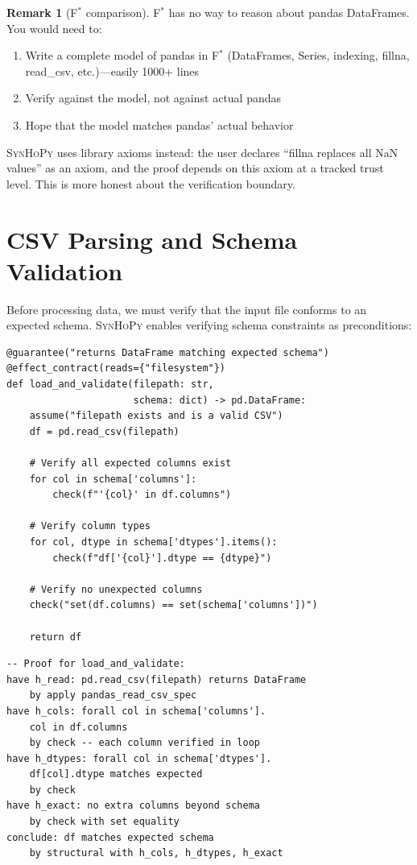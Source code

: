 \documentclass[11pt,a4paper]{report}
\theoremstyle{definition}
\newtheorem{remark}[definition]{Remark}
\theoremstyle{plain}
\newcommand{\fstar}{F$^{*}$}
\newcommand{\synhopy}{\textsc{SynHoPy}}
\begin{document}
\begin{remark}[\fstar{} comparison]
\fstar{} has no way to reason about pandas DataFrames. You would need to:
\begin{enumerate}
  \item Write a complete model of pandas in \fstar{} (DataFrames, Series, indexing,
    fillna, read\_csv, etc.)---easily 1000+ lines
  \item Verify against the model, not against actual pandas
  \item Hope that the model matches pandas' actual behavior
\end{enumerate}
\synhopy{} uses library axioms instead: the user declares ``fillna replaces all
NaN values'' as an axiom, and the proof depends on this axiom at a tracked trust
level. This is more honest about the verification boundary.
\end{remark}

\section{CSV Parsing and Schema Validation}

Before processing data, we must verify that the input file conforms to an
expected schema.  \synhopy{} enables verifying schema constraints as
preconditions:

\begin{lstlisting}[style=synhopy]
@guarantee("returns DataFrame matching expected schema")
@effect_contract(reads={"filesystem"})
def load_and_validate(filepath: str,
                      schema: dict) -> pd.DataFrame:
    assume("filepath exists and is a valid CSV")
    df = pd.read_csv(filepath)

    # Verify all expected columns exist
    for col in schema['columns']:
        check(f"'{col}' in df.columns")

    # Verify column types
    for col, dtype in schema['dtypes'].items():
        check(f"df['{col}'].dtype == {dtype}")

    # Verify no unexpected columns
    check("set(df.columns) == set(schema['columns'])")

    return df
\end{lstlisting}

\begin{lstlisting}[style=proof]
-- Proof for load_and_validate:
have h_read: pd.read_csv(filepath) returns DataFrame
    by apply pandas_read_csv_spec
have h_cols: forall col in schema['columns'].
    col in df.columns
    by check -- each column verified in loop
have h_dtypes: forall col in schema['dtypes'].
    df[col].dtype matches expected
    by check
have h_exact: no extra columns beyond schema
    by check with set equality
conclude: df matches expected schema
    by structural with h_cols, h_dtypes, h_exact
\end{lstlisting}
\end{document}
